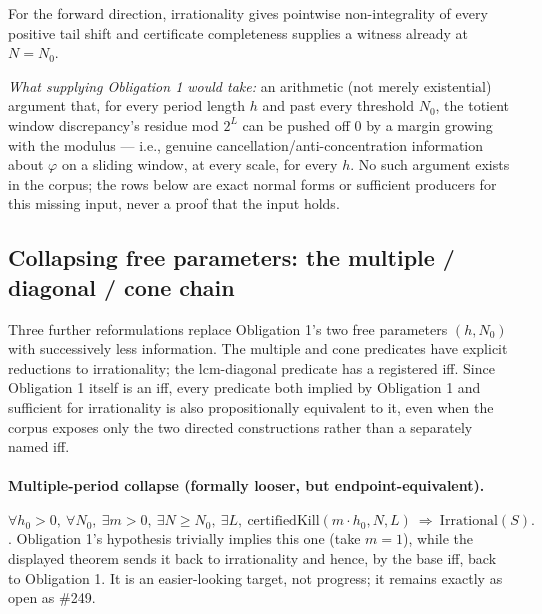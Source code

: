 For the forward direction, irrationality gives pointwise non-integrality of
every positive tail shift and certificate completeness supplies a witness
already at $N=N_0$.

\emph{What supplying Obligation 1 would take:} an arithmetic (not merely
existential) argument that, for every period length $h$ and past every
threshold $N_0$, the totient window discrepancy's residue mod $2^L$ can be
pushed off $0$ by a margin growing with the modulus — i.e., genuine
cancellation/anti-concentration information about $\varphi$ on a sliding
window, at every scale, for every $h$. No such argument exists in the
corpus; the rows below are exact normal forms or sufficient producers for
this missing input, never a proof that the input holds.

\subsection{Collapsing free parameters: the multiple / diagonal / cone chain}

Three further reformulations replace Obligation 1's two free parameters
$(h,N_0)$ with successively less information.  The multiple and cone
predicates have explicit reductions to irrationality; the lcm-diagonal
predicate has a registered iff.  Since Obligation 1 itself is an iff, every
predicate both implied by Obligation 1 and sufficient for irrationality is
also propositionally equivalent to it, even when the corpus exposes only
the two directed constructions rather than a separately named iff.

\paragraph{Multiple-period collapse (formally looser, but endpoint-equivalent).}
\[
  \forall h_0>0,\ \forall N_0,\ \exists m>0,\ \exists N\ge N_0,\ \exists L,\
    \mathrm{certifiedKill}(m\cdot h_0, N, L)
  \ \Longrightarrow\ \mathrm{Irrational}(S).
\]
\quad \ev{Lean} \quad \scale{cofinal} \quad \coord{other:lcm-period-multiple}.
Obligation 1's hypothesis trivially implies this one (take $m=1$), while the
displayed theorem sends it back to irrationality and hence, by the base iff,
back to Obligation 1.  It is an easier-looking target, not progress; it
remains exactly as open as \#249.


